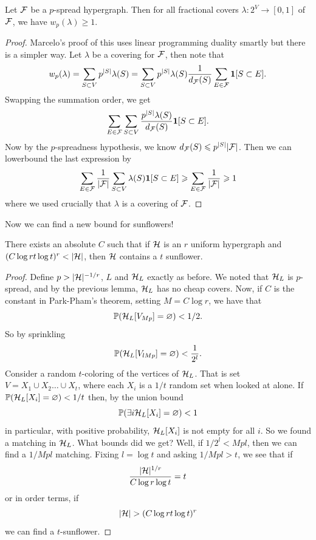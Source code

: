 \begin{lemma}
	Let $\mathcal{F}$ be a $p$-spread hypergraph. Then for all fractional covers
	$\lambda : 2^V \to [0,1]$
	of $\mathcal{F}$, we have $w_p(\lambda) \geq 1$.
\end{lemma}
\begin{proof}
	Marcelo's proof of this uses linear programming duality smartly but
	there is a simpler way.
	Let $\lambda$ be a covering for $\mathcal{F}$, then note that
	\[
		w_p(\lambda) = \sum_{S \subset V} p^{|S|}\lambda(S) =
		\sum_{S \subset V} p^{|S|}\lambda(S) \frac{1}{d_{\mathcal{F}}(S)} \sum_{E
		\in \mathcal{F}} \bm{1}[S \subset E].
	\]
	Swapping the summation order, we get
	\[
		\sum_{E \in \mathcal{F}} \sum_{S \subset V}
		\frac{p^{|S|}\lambda(S)}{d_{\mathcal{F}}(S)} \bm{1}[S \subset E].
	\]
	Now by the $p$-spreadness hypothesis, we know $d_{\mathcal{F}}(S) \leqslant
	p^{|S|}|\mathcal{F}|$. Then we can lowerbound
	the last expression by
	\[
		\sum_{E \in \mathcal{F}} \frac{1}{|\mathcal{F}|} \sum_{S \subset V} \lambda(S)
		\bm{1}[S \subset E] \geqslant \sum_{E \in \mathcal{F}} \frac{1}{|\mathcal{F}|} \geqslant 1
	\]
	where we used crucially that $\lambda$ is a covering of $\mathcal{F}$.
\end{proof}

Now we can find a new bound for sunflowers!
\begin{theorem}
	There exists an absolute $C$ such that if $\mathcal{H}$ is an $r$ uniform
	hypergraph and
	$(C \log r t\log t)^r < |\mathcal{H}|$, then $\mathcal{H}$ contains a $t$ sunflower.
\end{theorem}

\begin{proof}
	Define $p > |\mathcal{H}|^{-1/r}$, $L$ and $\mathcal{H}_L$ exactly as before. We
	noted that $\mathcal{H}_L$ is $p$-spread,
	and by the previous lemma, $\mathcal{H}_L$ has no cheap covers. Now, if $C$
	is the constant in Park-Pham's
	theorem, setting $M = C \log r$, we have that
	\[
		\mathbb{P}( \mathcal{H}_L [V_{Mp}] = \varnothing) < 1/2.
	\]
	So by sprinkling
	\[
		\mathbb{P}(\mathcal{H}_L[V_{lMp}] = \varnothing) < \frac{1}{2^l}.
	\]
	Consider a random $t$-coloring of the vertices of $\mathcal{H}_L$. That is set
	$V = X_1 \cup X_2 \dots \cup X_t$, where each $X_i$ is a $1/t$
	random set when looked at alone.
	If $\mathbb{P}(\mathcal{H}_L[X_i] = \varnothing) < 1/t$ then, by the union bound
	\[
		\mathbb{P}(\exists i \mathcal{H}_L[X_i] = \varnothing) < 1
	\]
	in particular, with positive probability, $\mathcal{H}_L[X_i]$ is not empty
	for all $i$.
	So we found a matching in $\mathcal{H}_L$. What bounds did we get? Well, if
	$1/2^l < Mpl$,
	then we can find a $1/Mpl$ matching. Fixing $l = \log t$ and asking
	$1/Mpl > t$,
	we see that if
	\[
		\frac{|\mathcal{H}|^{1/r}}{C\log r \log t} = t
	\]
	or in order terms, if
	\[
		|\mathcal{H}| > (C \log r t \log t)^r
	\]
	we can find a $t$-sunflower.
\end{proof}

